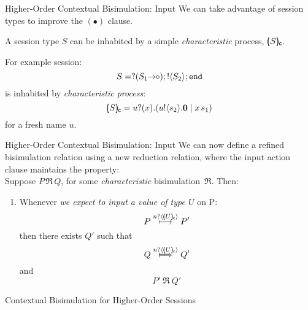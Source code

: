 \documentclass{beamer}
\begin{document}
	\begin{frame}{Higher-Order Contextual Bisimulation: Input}
		We can take advantage of session types to improve the
		$(\bullet)$ clause.
		\vspace{3mm}

		\begin{definition}
			A session type $S$ can be inhabited by a simple
			{\em characteristic} process, $[\!\!(S)\!\!]_{\mathsf{c}}$.
		\end{definition}
		\vspace{3mm}

		For example session:
		\[
			S = ? (S_1\!\! \rightarrow\!\! \diamond) ; ! \langle S_2 \rangle ; \mathtt{end}
		\]
		is inhabited by {\em characteristic process}:
		\[
			[\!\!(S)\!\!]_{\mathsf{c}} = u ? (x) . (u ! \langle s_2 \rangle . \mathbf{0} \;|\; x\, {s_1})
		\]
		for a fresh name $u$.
	\end{frame}

	\begin{frame}{Higher-Order Contextual Bisimulation: Input}
		We can now define a refined bisimulation relation
		using a new reduction relation, where the input action
		clause maintains the property:
		\\[4mm]

		Suppose $P \,\Re\, Q$, for some {\em characteristic} bisimulation~$\Re$. Then:
		\begin{enumerate}[$(\bullet)$]
			\item	Whenever {\em we expect to input a value of type $U$} on P:
				\[
					P \stackrel{n ? \langle [\!\!(U)\!\!]_{\mathsf{c}} \rangle}{\longmapsto} P'
				\]
				then there exists $Q'$ such that
				\[
					Q \Hby{\bactinp{n}{\omapchar{U}}} Q'
				\]
				and
				\[
					P'\ \Re\ Q'
				\]
		\end{enumerate}
	\end{frame}

	\begin{frame}{Contextual Bisimulation for Higher-Order Sessions}
		
	\end{frame}
	
\end{document}
